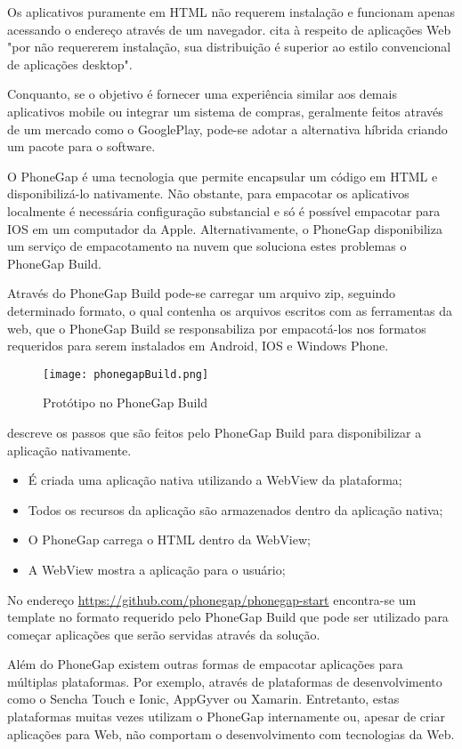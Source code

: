 Os aplicativos puramente em HTML não requerem instalação e
funcionam apenas acessando o endereço através de um navegador.
\citet{browserGamesTechnologyAndFuture} cita à respeito de
aplicações Web "por não requererem instalação, sua distribuição é
superior ao estilo convencional de aplicações desktop".

Conquanto, se o objetivo é fornecer uma experiência similar aos
demais aplicativos mobile ou integrar um sistema de compras, geralmente
feitos através de um mercado como o GooglePlay, pode-se adotar a
alternativa híbrida criando um pacote para o software.

O PhoneGap é uma tecnologia que permite encapsular um código em
HTML e disponibilizá-lo nativamente. Não obstante, para empacotar
os aplicativos localmente é necessária configuração substancial
e só é possível empacotar para IOS em um computador da Apple.
Alternativamente, o PhoneGap disponibiliza um serviço de empacotamento
na nuvem que soluciona estes problemas o PhoneGap Build.

Através do PhoneGap Build pode-se carregar um arquivo zip, seguindo
determinado formato, o qual contenha os arquivos escritos com as
ferramentas da web, que o PhoneGap Build se responsabiliza por
empacotá-los nos formatos requeridos para serem instalados em Android,
IOS e Windows Phone.

\begin{figure}[H]
    \centering
    \texttt{[image: phonegapBuild.png]}
    \caption{Protótipo no PhoneGap Build}
\end{figure}

\citet{publishHtml5} descreve os passos que são feitos pelo PhoneGap Build para
disponibilizar a aplicação nativamente.

\begin{itemize}
\item É criada uma aplicação nativa utilizando a WebView da plataforma;
\item Todos os recursos da aplicação são armazenados dentro da aplicação nativa;
\item O PhoneGap carrega o HTML dentro da WebView;
\item A WebView mostra a aplicação para o usuário;
\end{itemize}

No endereço \url{https://github.com/phonegap/phonegap-start}
encontra-se um template no formato requerido pelo PhoneGap Build que
pode ser utilizado para começar aplicações que serão servidas
através da solução.

Além do PhoneGap existem outras formas de empacotar aplicações
para múltiplas plataformas. Por exemplo, através de plataformas de
desenvolvimento como o Sencha Touch e Ionic, AppGyver ou Xamarin.
Entretanto, estas plataformas muitas vezes utilizam o PhoneGap
internamente ou, apesar de criar aplicações para Web, não comportam o
desenvolvimento com tecnologias da Web.
